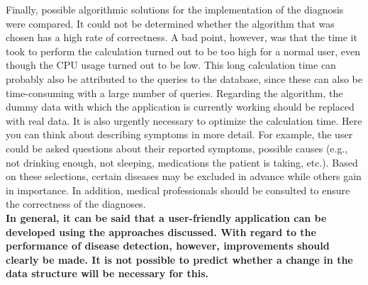 Finally, possible algorithmic solutions for the implementation of the diagnosis were compared. It could not be determined whether the algorithm that was chosen has a high rate of correctness. A bad point, however, was that the time it took to perform the calculation turned out to be too high for a normal user, even though the CPU usage turned out to be low. This long calculation time can probably also be attributed to the queries to the database, since these can also be time-consuming with a large number of queries. Regarding the algorithm, the dummy data with which the application is currently working should be replaced with real data. It is also urgently necessary to optimize the calculation time. Here you can think about describing symptoms in more detail. For example, the user could be asked questions about their reported symptoms, possible causes (e.g., not drinking enough, not sleeping, medications the patient is taking, etc.). Based on these selections, certain diseases may be excluded in advance while others gain in importance. In addition, medical professionals should be consulted to ensure the correctness of the diagnoses. 
\newline \\
\textbf{In general, it can be said that a user-friendly application can be developed using the approaches discussed. With regard to the performance of disease detection, however, improvements should clearly be made. It is not possible to predict whether a change in the data structure will be necessary for this.}

